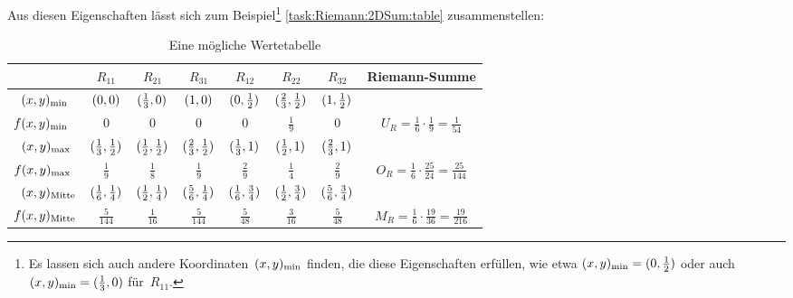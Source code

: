 \documentclass[../full]{subfiles}
\begin{document}
    Aus diesen Eigenschaften l\"asst sich zum Beispiel\footnote{
        Es lassen sich auch andere Koordinaten~\( \lparen x, y\rparen_{\min} \) finden,
        die diese Eigenschaften erf\"ullen,
        wie etwa \mbox{\( \lparen x, y\rparen_{\min} = \lparen0, \frac{1}{2}\rparen \)}
        oder auch \mbox{\( \lparen x, y\rparen_{\min} = \lparen\frac{1}{3}, 0\rparen \)}
        f\"ur~\( R_{11} \).
    } \autoref{task:Riemann:2DSum:table} zusammenstellen:
    \begin{table}
        \centering
        \caption{Eine m\"ogliche Wertetabelle}
        \label{task:Riemann:2DSum:table}

        \newcommand\xyArrange[3][]{ \paren{#2, #3}_{#1} }
        \begin{tabular}{ l || *5{c|} c || c }
                & \( R_{11} \) & \( R_{21} \) & \( R_{31} \)
                & \( R_{12} \) & \( R_{22} \) & \( R_{32} \)
                & Riemann-Summe
            \\ \hline \hline
            \( \phantom{f} \xyArrange[\min]{x}{y} \)
                & \( \xyArrange{0}{0} \)
                & \( \xyArrange{\frac{1}{3}}{0} \)
                & \( \xyArrange{1}{0} \)
                & \( \xyArrange{0}{\frac{1}{2}} \)
                & \( \xyArrange{\frac{2}{3}}{\frac{1}{2}} \)
                & \( \xyArrange{1}{\frac{1}{2}} \)
            \\
            \( f \xyArrange[\min]{x}{y} \)
                & \( 0 \) & \( 0 \) & \( 0 \)
                & \( 0 \) & \( \frac{1}{9} \) & \( 0 \)
                & \( U_R = \frac{1}{6} \cdot \frac{1}{9} = \frac{1}{54} \)
            \\ \hline
            \( \phantom{f} \xyArrange[\max]{x}{y} \)
                & \( \xyArrange{\frac{1}{3}}{\frac{1}{2}} \)
                & \( \xyArrange{\frac{1}{2}}{\frac{1}{2}} \)
                & \( \xyArrange{\frac{2}{3}}{\frac{1}{2}} \)
                & \( \xyArrange{\frac{1}{3}}{1} \)
                & \( \xyArrange{\frac{1}{2}}{1} \)
                & \( \xyArrange{\frac{2}{3}}{1} \)
            \\
            \( f \xyArrange[\max]{x}{y} \)
                & \( \frac{1}{9} \) & \( \frac{1}{8} \) & \( \frac{1}{9} \)
                & \( \frac{2}{9} \) & \( \frac{1}{4} \) & \( \frac{2}{9} \)
                & \( O_R = \frac{1}{6} \cdot \frac{25}{24} = \frac{25}{144} \)
            \\ \hline
            \( \phantom{f} \xyArrange[\mathrm{Mitte}]{x}{y} \)
                & \( \xyArrange{\frac{1}{6}}{\frac{1}{4}} \)
                & \( \xyArrange{\frac{1}{2}}{\frac{1}{4}} \)
                & \( \xyArrange{\frac{5}{6}}{\frac{1}{4}} \)
                & \( \xyArrange{\frac{1}{6}}{\frac{3}{4}} \)
                & \( \xyArrange{\frac{1}{2}}{\frac{3}{4}} \)
                & \( \xyArrange{\frac{5}{6}}{\frac{3}{4}} \)
            \\
            \( f \xyArrange[\mathrm{Mitte}]{x}{y} \)
                & \( \frac{5}{144} \) & \( \frac{1}{16} \) & \( \frac{5}{144} \)
                & \( \frac{5}{48} \) & \( \frac{3}{16} \) & \( \frac{5}{48} \)
                & \( M_R = \frac{1}{6} \cdot \frac{19}{36} = \frac{19}{216} \)
        \end{tabular}
    \end{table}
\end{document}
